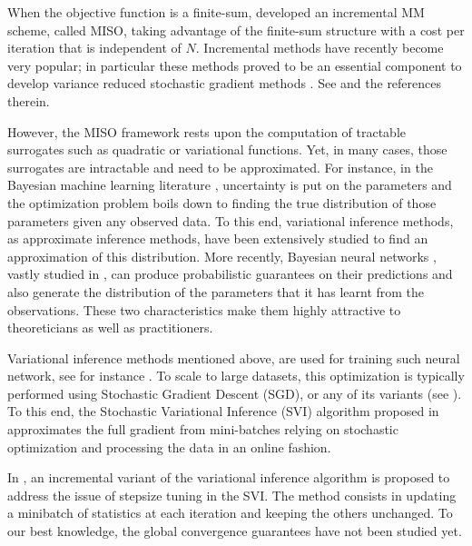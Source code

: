 \documentclass[11pt]{article}
\theoremstyle{t}
\begin{document}
When the objective function is a finite-sum, \citep{mairal} developed an incremental MM scheme, called MISO, taking advantage of the finite-sum structure with a cost per iteration that is independent of $N$. Incremental methods have recently become very popular; in particular these methods proved to be an essential component to develop variance reduced stochastic gradient methods \citep{roux, bach}. See \citep{mairal} and the references therein.

However, the MISO framework rests upon the computation of tractable surrogates such as quadratic or variational functions. Yet, in many cases, those surrogates are intractable and need to be approximated. For instance, in the Bayesian machine learning literature \citep{ghahramani2015probabilistic}, uncertainty is put on the parameters and the optimization problem boils down to finding the true distribution of those parameters given any observed data. 
To this end, variational inference methods, as approximate inference methods, \citep{blei:bbvi, kingma} have been extensively studied to find an approximation of this distribution. 
More recently, Bayesian neural networks \citep{neal:bnn, book:deeplearning}, vastly studied in \citep{rezende, blundell,thesis:gal,polson,mullachery}, can  produce probabilistic guarantees on their predictions and also generate the distribution of the parameters that it has learnt from the observations. 
These two characteristics make them highly attractive to theoreticians as well as practitioners. 

Variational inference methods mentioned above, are used for training such neural network, see for instance \citep{pawlowski, gal,trippe}. 
To scale to large datasets, this optimization is typically performed using Stochastic Gradient Descent (SGD), or any of its variants  (see \citep{bottou2018optimization}).
To this end, the Stochastic Variational Inference (SVI) algorithm proposed in \citep{hofman} approximates the full gradient from mini-batches relying on stochastic optimization \citep{robbins1951A} and processing the data in an online fashion.

In \citep{archambeau2015incremental}, an incremental variant of the variational inference algorithm is proposed to address the issue of stepsize tuning in the SVI. The method consists in updating a minibatch of statistics at each iteration and keeping the others unchanged.
To our best knowledge, the global convergence guarantees have not been studied yet.
\end{document}
